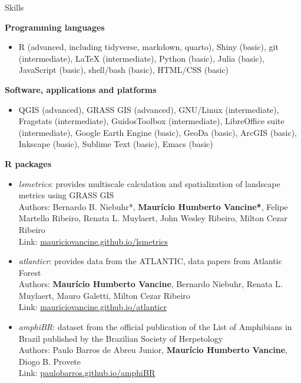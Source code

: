 \documentclass{resume}
\begin{document}

\begin{rSection}{Skills}

{\bf Programming languages}
\begin{itemize}
\item R (advanced, including tidyverse, markdown, quarto), Shiny (basic), git (intermediate), LaTeX (intermediate), Python (basic), Julia (basic), JavaScript (basic), shell/bash (basic), HTML/CSS (basic)
\end{itemize}

{\bf Software, applications and platforms}
\begin{itemize}
\item QGIS (advanced), GRASS GIS (advanced), GNU/Linux (intermediate), Fragstats (intermediate), GuidosToolbox (intermediate), LibreOffice suite (intermediate), Google Earth Engine (basic), GeoDa (basic), ArcGIS (basic), Inkscape (basic), Sublime Text (basic), Emacs (basic)
\end{itemize}

{\bf R packages}
\begin{itemize} 
\item {\it lsmetrics}: provides multiscale calculation and spatialization of landscape metrics using GRASS GIS\\
Authors: Bernardo B. Niebuhr*, {\bf Maurício Humberto Vancine*}, Felipe Martello Ribeiro, Renata L. Muylaert, John Wesley Ribeiro, Milton Cezar Ribeiro\\
Link: \href{https://mauriciovancine.github.io/lsmetrics}{\underline{mauriciovancine.github.io/lsmetrics}}

\item {\it atlanticr}: provides data from the ATLANTIC, data papers from Atlantic Forest\\
Authors: {\bf Maurício Humberto Vancine}, Bernardo Niebuhr, Renata L. Muylaert, Mauro Galetti, Milton Cezar Ribeiro\\
Link: \href{https://mauriciovancine.github.io/atlanticr}{\underline{mauriciovancine.github.io/atlanticr}}

\item {\it amphiBR}: dataset from the official publication of the List of Amphibians in Brazil published by the Brazilian Society of Herpetology\\
Authors: Paulo Barros de Abreu Junior, {\bf Maurício Humberto Vancine}, Diogo B. Provete\\
Link: \href{https://paulobarros.github.io/amphiBR}{\underline{paulobarros.github.io/amphiBR}}


\end{itemize}
\end{rSection}
\end{document}

